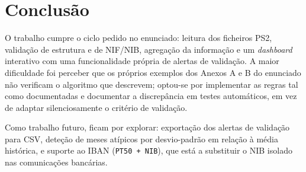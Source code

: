 \documentclass[11pt,a4paper]{report}
\begin{document}
\chapter{Conclusão}
\label{chap:conclusao}

O trabalho cumpre o ciclo pedido no enunciado: leitura dos ficheiros PS2,
validação de estrutura e de NIF/NIB, agregação da informação e um
\textit{dashboard} interativo com uma funcionalidade própria de alertas de
validação. A maior dificuldade foi perceber que os próprios exemplos dos
Anexos A e B do enunciado não verificam o algoritmo que descrevem; optou-se
por implementar as regras tal como documentadas e documentar a discrepância
em testes automáticos, em vez de adaptar silenciosamente o critério de
validação.

Como trabalho futuro, ficam por explorar: exportação dos alertas de
validação para CSV, deteção de meses atípicos por desvio-padrão em relação à
média histórica, e suporte ao IBAN (\texttt{PT50 + NIB}), que está a
substituir o NIB isolado nas comunicações bancárias.



\end{document}
